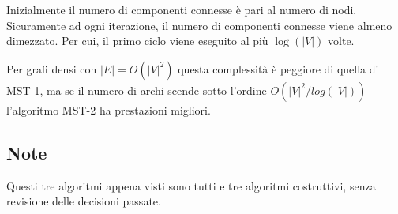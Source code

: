 \documentclass[../template]{subfiles}
\begin{document}
Inizialmente il numero di componenti connesse è pari al numero di nodi.
Sicuramente ad ogni iterazione, il numero di componenti connesse viene
almeno dimezzato. Per cui, il primo ciclo viene eseguito al più $\log(|V|)$
volte.

Per grafi densi con $|E| = O(|V|^2)$ questa complessità
è peggiore di quella di MST-1, ma se il numero di archi scende sotto l'ordine $O(|V|^2/log(|V|))$ l'algoritmo MST-2 ha prestazioni migliori.

\subsection{Note}
Questi tre algoritmi appena visti sono tutti e tre algoritmi costruttivi, senza revisione delle decisioni passate.
\end{document}
